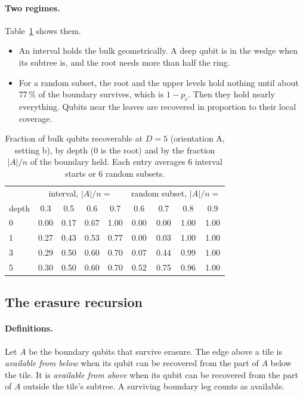 \paragraph{Two regimes.} Table~\ref{tab:holocode-wedge} shows them.
\begin{itemize}[nosep]
\item An interval holds the bulk geometrically. A deep qubit is in the wedge when its subtree is, and the root needs more than half the
  ring.
\item For a random subset, the root and the upper levels hold nothing until about 77\,\% of the boundary survives, which is $1-p_c$.
  Then they hold nearly everything. Qubits near the leaves are recovered in proportion to their local coverage.
\end{itemize}

\begin{table}[ht]\centering\small
\caption{Fraction of bulk qubits recoverable at $D=5$ (orientation A, setting b), by depth (0 is the root) and by the fraction
$|A|/n$ of the boundary held. Each entry averages 6 interval starts or 6 random subsets. }\label{tab:holocode-wedge}
\begin{tabular}{lcccccccc}\toprule
& \multicolumn{4}{c}{interval, $|A|/n=$} & \multicolumn{4}{c}{random subset, $|A|/n=$} \\
depth & 0.3 & 0.5 & 0.6 & 0.7 & 0.6 & 0.7 & 0.8 & 0.9 \\\midrule
0 & 0.00 & 0.17 & 0.67 & 1.00 & 0.00 & 0.00 & 1.00 & 1.00 \\
1 & 0.27 & 0.43 & 0.53 & 0.77 & 0.00 & 0.03 & 1.00 & 1.00 \\
3 & 0.29 & 0.50 & 0.60 & 0.70 & 0.07 & 0.44 & 0.99 & 1.00 \\
5 & 0.30 & 0.50 & 0.60 & 0.70 & 0.52 & 0.75 & 0.96 & 1.00 \\\bottomrule
\end{tabular}
\end{table}

\subsection{The erasure recursion}\label{sec:holocode-erasure}

\paragraph{Definitions.} Let $A$ be the boundary qubits that survive erasure. The edge above a tile is \emph{available from below} when
its qubit can be recovered from the part of $A$ below the tile. It is \emph{available from above} when its qubit can be recovered from
the part of $A$ outside the tile's subtree. A surviving boundary leg counts as available.

